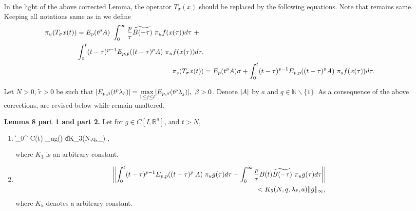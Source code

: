 	
	In the light of the above corrected Lemma, the operator $T_{\sigma}(x)$ \citep[ eqn.(44) and eqn.(45)]{deshpande2016local} should be replaced by the following equations. Note that \citep[eqn.(45)]{deshpande2016local} remains same. Keeping all notations same as in \cite{deshpande2016local} we define
\begin{align} \label{define}
\begin{split}
\pi_u(T_{\sigma}x(t)) &= E_{p}(t^{p} A) ~ \int_{0}^{\infty} \frac{p}{\tau} \widetilde{B(-\tau)}~ \pi_u f(x(\tau))d\tau ~+\\ &\int_{0}^{t} (t-\tau)^{p-1} E_{p,p}( (t-\tau)^p A)~ \pi_u f(x(\tau))d\tau,
\end{split}\\
\pi_s(T_{\sigma}x(t)) &=  E_p(t^p A)\sigma + \int_{0}^{t} (t-\tau)^{p-1} E_{p,p}((t-\tau)^p A) ~\pi_s f(x(\tau))d\tau.
\end{align}

 

Let $N > 0$, $\tilde{r}>0$ be such that $\lvert E_{p,\beta}(t^{p} \lambda_{\tilde{r}})\rvert = \max\limits_{1 \leq j \leq l} \lvert E_{p,\beta}(t^{p} \lambda_j)\rvert,~\beta>0$. Denote $\lvert A\rvert$ by $a$ and $q \in \mathbb{N}\backslash\{1\}$. As a consequence of the above corrections, \citep[Lemma 8 part 1 and part 2 (eqn. (46) and eqn. (47))]{deshpande2016local} are revised below while \citep[eqn. (48) and eqn. (49)]{deshpande2016local} remain unaltered.

\textbf{Lemma 8 part 1 and part 2.} \label{lem8}
Let for $g \in C[I,\mathbb{R}^n]$, and $t>N$,
\begin{enumerate}
	\item 
	\begin{bulletequation}
		\left\| \int_{0}^{\infty}  C(t) \; \pi_ug(\tau) d\tau \right\| \leq K_3(N,q,\lambda_{}) ,
	\end{bulletequation}
	where $K_3$ is an arbitrary constant. 
	\item \begin{align}
	\begin{split}
	\left\| \int_{0}^{t} (t-\tau)^{p-1} E_{p,p}({(t-\tau)^p}\:A)\; \pi_ug(\tau) d\tau + \int_{0}^{\infty}\frac{p}{\tau} B(t)\widetilde{B(-\tau)}~ \pi_ug(\tau) d\tau\right\|\\ < K_5(N,q,\lambda_{\tilde{r}},a)\lVert g\rVert_{\infty},\end{split} \end{align} where $K_5$ denotes a arbitrary constant.
\end{enumerate}	

